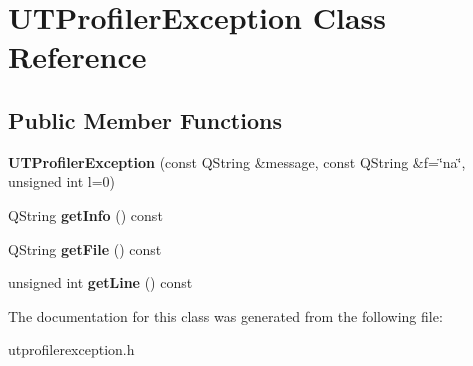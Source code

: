 \hypertarget{class_u_t_profiler_exception}{\section{U\+T\+Profiler\+Exception Class Reference}
\label{class_u_t_profiler_exception}
}
\subsection*{Public Member Functions}
\begin{DoxyCompactItemize}
\item 
\hypertarget{class_u_t_profiler_exception_afd289268648bada41417156ceb1269fd}{{\bfseries U\+T\+Profiler\+Exception} (const Q\+String \&message, const Q\+String \&f=\char`\"{}na\char`\"{}, unsigned int l=0)}\label{class_u_t_profiler_exception_afd289268648bada41417156ceb1269fd}

\item 
\hypertarget{class_u_t_profiler_exception_a6f4582234c00b4fe67776ef10c5370bf}{Q\+String {\bfseries get\+Info} () const }\label{class_u_t_profiler_exception_a6f4582234c00b4fe67776ef10c5370bf}

\item 
\hypertarget{class_u_t_profiler_exception_ae54e6a5c0836dcc62fee879651ae5679}{Q\+String {\bfseries get\+File} () const }\label{class_u_t_profiler_exception_ae54e6a5c0836dcc62fee879651ae5679}

\item 
\hypertarget{class_u_t_profiler_exception_aa3c2efb28c6b482859b26b8f59b4b32e}{unsigned int {\bfseries get\+Line} () const }\label{class_u_t_profiler_exception_aa3c2efb28c6b482859b26b8f59b4b32e}

\end{DoxyCompactItemize}


The documentation for this class was generated from the following file\+:\begin{DoxyCompactItemize}
\item 
utprofilerexception.\+h\end{DoxyCompactItemize}
